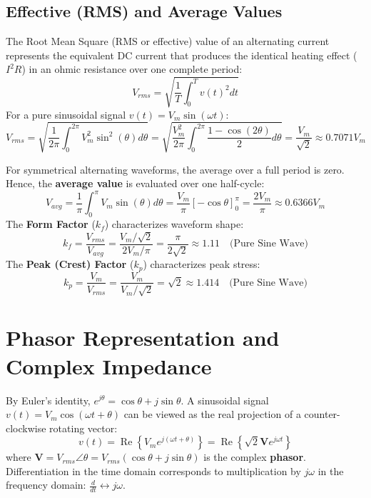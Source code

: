\subsection{Effective (RMS) and Average Values}
\begin{definition}
The Root Mean Square (RMS or effective) value of an alternating current represents the equivalent DC current that produces the identical heating effect ($I^2 R$) in an ohmic resistance over one complete period:
\begin{equation}
V_{rms} = \sqrt{\frac{1}{T}\int_0^T v(t)^2 dt}
\end{equation}
For a pure sinusoidal signal $v(t) = V_m \sin(\omega t)$:
\begin{equation}
V_{rms} = \sqrt{\frac{1}{2\pi}\int_0^{2\pi} V_m^2 \sin^2(\theta) d\theta} = \sqrt{\frac{V_m^2}{2\pi}\int_0^{2\pi} \frac{1 - \cos(2\theta)}{2} d\theta} = \frac{V_m}{\sqrt{2}} \approx 0.7071 V_m
\end{equation}
\end{definition}

\begin{definition}
For symmetrical alternating waveforms, the average over a full period is zero. Hence, the \textbf{average value} is evaluated over one half-cycle:
\begin{equation}
V_{avg} = \frac{1}{\pi}\int_0^\pi V_m \sin(\theta) d\theta = \frac{V_m}{\pi}[-\cos\theta]_0^\pi = \frac{2 V_m}{\pi} \approx 0.6366 V_m
\end{equation}
The \textbf{Form Factor} ($k_f$) characterizes waveform shape:
\begin{equation}
k_f = \frac{V_{rms}}{V_{avg}} = \frac{V_m / \sqrt{2}}{2 V_m / \pi} = \frac{\pi}{2\sqrt{2}} \approx 1.11 \quad \text{(Pure Sine Wave)}
\end{equation}
The \textbf{Peak (Crest) Factor} ($k_p$) characterizes peak stress:
\begin{equation}
k_p = \frac{V_m}{V_{rms}} = \frac{V_m}{V_m / \sqrt{2}} = \sqrt{2} \approx 1.414 \quad \text{(Pure Sine Wave)}
\end{equation}
\end{definition}

\section{Phasor Representation and Complex Impedance}
By Euler's identity, $e^{j\theta} = \cos\theta + j\sin\theta$. A sinusoidal signal $v(t) = V_m \cos(\omega t + \theta)$ can be viewed as the real projection of a counter-clockwise rotating vector:
\begin{equation}
v(t) = \operatorname{Re}\left\{ V_m e^{j(\omega t + \theta)} \right\} = \operatorname{Re}\left\{ \sqrt{2} \mathbf{V} e^{j\omega t} \right\}
\end{equation}
where $\mathbf{V} = V_{rms}\angle \theta = V_{rms}(\cos\theta + j\sin\theta)$ is the complex \textbf{phasor}. Differentiation in the time domain corresponds to multiplication by $j\omega$ in the frequency domain: $\frac{d}{dt} \longleftrightarrow j\omega$.

